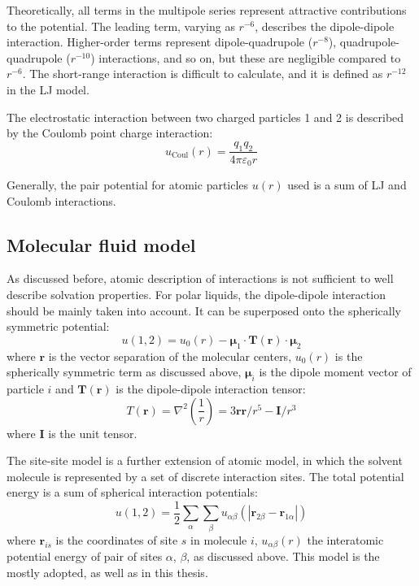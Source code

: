 Theoretically, all terms in the multipole series represent attractive
contributions to the potential. The leading term, varying as $r^{-6}$,
describes the dipole-dipole interaction. Higher-order terms represent
dipole-quadrupole ($r^{-8}$), quadrupole-quadrupole ($r^{-10}$)
interactions, and so on, but these are negligible compared to $r^{-6}$.
The short-range interaction is difficult to calculate, and it is defined
as $r^{-12}$ in the LJ model. 

The electrostatic interaction between two charged particles 1 and
2 is described by the Coulomb point charge interaction:
\begin{equation}
u_{\mathrm{Coul}}(r)=\frac{q_{1}q_{2}}{4\pi\varepsilon_{0}r}
\end{equation}


Generally, the pair potential for atomic particles $u(r)$ used is
a sum of LJ and Coulomb interactions.


\subsection{Molecular fluid model}

As discussed before, atomic description of interactions is not sufficient
to well describe solvation properties. For polar liquids, the dipole-dipole
interaction should be mainly taken into account. It can be superposed
onto the spherically symmetric potential:
\begin{equation}
u(1,2)=u_{0}(r)-\boldsymbol{\mu}_{1}\cdot\mathbf{T}(\mathbf{r})\cdot\boldsymbol{\mu}_{2}
\end{equation}
where $\mathbf{r}$ is the vector separation of the molecular centers,
$u_{0}(r)$ is the spherically symmetric term as discussed above,
$\boldsymbol{\mu}_{i}$ is the dipole moment vector of particle $i$
and $\mathbf{T}(\mathbf{r})$ is the dipole-dipole interaction tensor:
\begin{equation}
T(\mathbf{r})=\nabla^{2}\left(\dfrac{1}{r}\right)=3\mathbf{r}\mathbf{r}/r^{5}-\mathbf{I}/r^{3}
\end{equation}
where $\mathbf{I}$ is the unit tensor.

The site-site model is a further extension of atomic model, in which
the solvent molecule is represented by a set of discrete interaction
sites. The total potential energy is a sum of spherical interaction
potentials: 
\begin{equation}
u(1,2)=\frac{1}{2}\sum_{\alpha}\sum_{\beta}u_{\alpha\beta}(\left|\mathbf{r}_{2\beta}-\mathbf{r}_{1\alpha}\right|)
\end{equation}
where $\mathbf{r}_{is}$ is the coordinates of site $s$ in molecule
$i$, $u_{\alpha\beta}(r)$ the interatomic potential energy of pair
of sites $\alpha$, $\beta$, as discussed above. This model is the
mostly adopted, as well as in this thesis.

